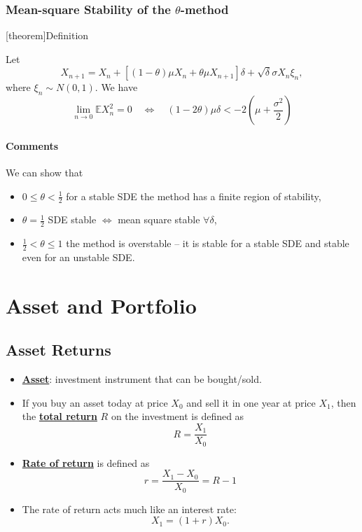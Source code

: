 \documentclass[twocolumn,landscape,10pt]{article}
\theoremstyle{definition}
\begin{document}
\subsubsection{Mean-square Stability of the $\theta$-method}

[theorem]{Definition}
\begin{mse stability}
    Let
    \[
        X_{n+1}=X_n+\left[(1-\theta)\mu X_n+\theta\mu
        X_{n+1}\right]\delta+\sqrt{\delta}\sigma X_n\xi_n,
    \]
    where $\xi_n\sim N(0,1)$. We have
    \[
        \underset{n\rightarrow 0}{\lim}\mathbb{E}X^2_n=0
        \quad\iff\quad
        (1-2\theta)\mu\delta<-2\left(\mu+\frac{\sigma^2}{2}\right)
    \]
\end{mse stability}

\paragraph{Comments}
We can show that
\begin{itemize}
    \item $0\le\theta<\frac{1}{2}$ for a stable SDE the method has a finite
        region of stability,
    \item $\theta=\frac{1}{2}$ SDE stable $\iff$ mean square stable
        $\forall\delta$,
    \item $\frac{1}{2}<\theta\le 1$ the method is overstable -- it is stable for
        a stable SDE and stable even for an unstable SDE.
\end{itemize}

\section{Asset and Portfolio}

\subsection{Asset Returns}

\begin{itemize}
    \item \textbf{\underline{Asset}}: investment instrument that can be
        bought/sold.
    \item If you buy an asset today at price $X_0$ and sell it in one year at
        price $X_1$, then the \textbf{\underline{total return}} $R$ on the
        investment is defined as
        \[
            R=\frac{X_1}{X_0}
        \]
    \item \textbf{\underline{Rate of return}} is defined as
        \[
            r=\frac{X_1-X_0}{X_0}=R-1
        \]
    \item The rate of return acts much like an interest rate:
        \[
            X_1=(1+r)X_0.
        \]
\end{itemize}
\end{document}
